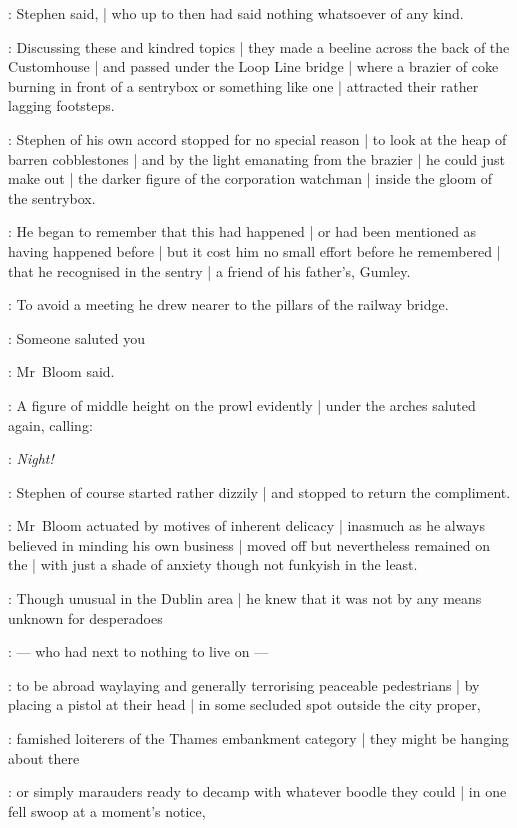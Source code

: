 :
Stephen said, |
who up to then had said nothing whatsoever of any kind.

:
Discussing these and kindred topics |
they made a beeline across the back of the Customhouse |
and passed under the Loop Line bridge |
where a brazier of coke burning in front of a sentrybox or something like one |
attracted their rather lagging footsteps.

:
Stephen of his own accord stopped for no special reason |
to look at the heap of barren cobblestones |
and by the light emanating from the brazier |
he could just make out |
the darker figure of the corporation watchman |
inside the gloom of the sentrybox.

:
He began to remember that this had happened |
or had been mentioned as having happened before |
but it cost him no small effort before he remembered |
that he recognised in the sentry |
a  friend of his father's, Gumley.

:
To avoid a meeting he drew nearer to the pillars of the railway bridge.

\Bloom:
Someone saluted you

:
Mr~Bloom said.

:
A figure of middle height on the prowl evidently |
under the arches saluted again, calling:

\LordJohnCorley:
\emph{Night!}

:
Stephen of course started rather dizzily |
and stopped to return the compliment.

:
Mr~Bloom actuated by motives of inherent delicacy |
inasmuch as he always believed in minding his own business |
moved off but nevertheless remained on the  |
with just a shade of anxiety though not funkyish in the least.

:
Though unusual in the Dublin area |
he knew that it was not by any means unknown for desperadoes

:
--- who had next to nothing to live on ---

:
to be abroad waylaying and generally terrorising peaceable pedestrians |
by placing a pistol at their head |
in some secluded spot outside the city proper,

:
famished loiterers of the Thames embankment category |
they might be hanging about there

:
or simply marauders ready to decamp with whatever boodle they could |
in one fell swoop at a moment's notice,

